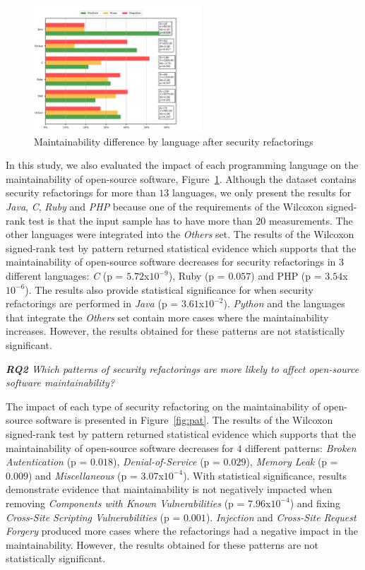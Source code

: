 \documentclass[10pt,conference]{IEEEtran}
\begin{document}
{\begin{figure}[h]
 	\centering
 	\includegraphics[width=0.56\textwidth]{figures/language.pdf}
 	\caption{Maintainability difference by language after security refactorings}
	\label{fig:lang_main}
\end{figure}

In this study, we also evaluated the impact of each programming language on the
maintainability of open-source software, Figure~\ref{fig:lang_main}. Although
the dataset contains security refactorings for more than $13$ languages, we only
present the results for \emph{Java}, \emph{C}, \emph{Ruby} and \emph{PHP}
because one of the requirements of the Wilcoxon signed-rank test is that the
input sample has to have more than $20$ measurements. The other languages were
integrated into the \emph{Others} set. The results of the Wilcoxon signed-rank
test by pattern returned statistical evidence which supports that the
maintainability of open-source software decreases for security refactorings in
$3$ different languages: \emph{C} (p = $5.72$x$10^{-9}$), Ruby (p = $0.057$) and
PHP (p = $3.54$x$10^{-6}$). The results also provide statistical significance
for when security refactorings are performed in \emph{Java} (p =
$3.61$x$10^{-2}$). \emph{Python} and the languages that integrate the
\emph{Others} set contain more cases where the maintainability increases.
However, the results obtained for these patterns are not statistically
significant.

\begin{framed}
\textit{\textbf{RQ2} Which patterns of security refactorings are more likely to
affect open-source software maintainability?}
\end{framed}

The impact of each type of security refactoring on the maintainability of
open-source software is presented in Figure~\ref{fig:pat}. The results of the
Wilcoxon signed-rank test by pattern returned statistical evidence which
supports that the maintainability of open-source software decreases for $4$
different patterns: \emph{Broken Autentication} (p = $0.018$),
\emph{Denial-of-Service} (p = $0.029$), \emph{Memory Leak} (p = $0.009$) and
\emph{Miscellaneous} (p = $3.07$x$10^{-4}$). With statistical significance,
results demonstrate evidence that maintainability is not negatively impacted
when removing \emph{Components with Known Vulnerabilities} (p = $7.96$x$10^{-4}$)
and fixing \emph{Cross-Site Scripting Vulnerabilities} (p = $0.001$).
\emph{Injection} and \emph{Cross-Site Request Forgery} produced more
cases where the refactorings had a negative impact in the maintainability.
However, the results obtained for these patterns are not statistically
significant.

}
\end{document}

